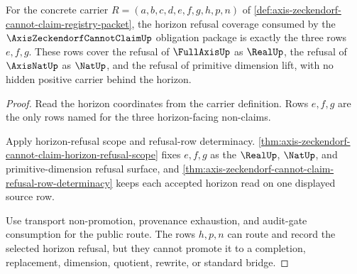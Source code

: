 \begin{theorem}
\label{thm:axis-zeckendorf-cannot-claim-horizon-refusal-coverage}
For the concrete carrier $R=(a,b,c,d,e,f,g,h,p,n)$ of \autoref{def:axis-zeckendorf-cannot-claim-registry-packet}, the horizon refusal coverage consumed by the $\AxisZeckendorfCannotClaimUp$ obligation package is exactly the three rows $e,f,g$. These rows cover the refusal of $\FullAxisUp$ as $\RealUp$, the refusal of $\AxisNatUp$ as $\NatUp$, and the refusal of primitive dimension lift, with no hidden positive carrier behind the horizon.
\end{theorem}
\begin{proof}
Read the horizon coordinates from the carrier definition. Rows $e,f,g$ are the only rows named for the three horizon-facing non-claims.

Apply horizon-refusal scope and refusal-row determinacy. \autoref{thm:axis-zeckendorf-cannot-claim-horizon-refusal-scope} fixes $e,f,g$ as the $\RealUp$, $\NatUp$, and primitive-dimension refusal surface, and \autoref{thm:axis-zeckendorf-cannot-claim-refusal-row-determinacy} keeps each accepted horizon read on one displayed source row.

Use transport non-promotion, provenance exhaustion, and audit-gate consumption for the public route. The rows $h,p,n$ can route and record the selected horizon refusal, but they cannot promote it to a completion, replacement, dimension, quotient, rewrite, or standard bridge.
\end{proof}

